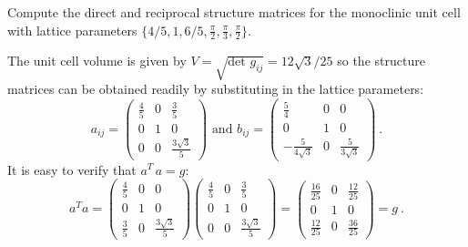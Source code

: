 \begin{example}
Compute the direct and reciprocal structure matrices for the monoclinic unit cell with lattice parameters $\{4/5,1,6/5,\frac{\pi}{2},\frac{\pi}{3},\frac{\pi}{2}\}$. 

\noindent The unit cell volume is given by $V=\sqrt{\text{det }g_{ij}}=12\sqrt{3}/25$ so the structure matrices can be obtained readily by substituting in the lattice parameters:
\[
	a_{ij} = \begin{pmatrix}\frac{4}{5}&0&\frac{3}{5}\\
	0 & 1 & 0\\
	0 & 0 & \frac{3\sqrt{3}}{5}\end{pmatrix} \text{ and }
	b_{ij} = \begin{pmatrix}
	\frac{5}{4}& 0 & 0 \\
	0 & 1 & 0 \\
	-\frac{5}{4\sqrt{3}} & 0 & \frac{5}{3\sqrt{3}}
	\end{pmatrix}\ .
\]
It is easy to verify that $a^T\,a=g$:
\[
a^T a = \begin{pmatrix}\frac{4}{5}&0&0\\
	0 & 1 & 0\\
	\frac{3}{5} & 0 & \frac{3\sqrt{3}}{5}\end{pmatrix}
	\begin{pmatrix}\frac{4}{5}&0&\frac{3}{5}\\
	0 & 1 & 0\\
	0 & 0 & \frac{3\sqrt{3}}{5}\end{pmatrix} = \begin{pmatrix}\frac{16}{25} & 0 & \frac{12}{25}\\ 0 & 1 & 0\\ \frac{12}{25} & 0 & \frac{36}{25}\end{pmatrix}=g\ .
\]
\end{example}

